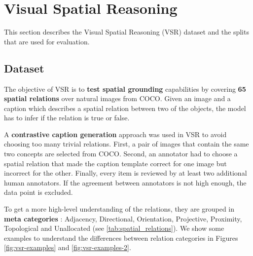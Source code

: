 \section{Visual Spatial Reasoning} \label{sec:vsr}

This section describes the Visual Spatial Reasoning (VSR) \cite{liu2022visual} dataset and the splits that are used for evaluation.

\subsection{Dataset}

The objective of VSR is to \textbf{test spatial grounding} capabilities by covering \textbf{65 spatial relations} over natural images from COCO. Given an image and a caption which describes a spatial relation between two of the objects, the model has to infer if the relation is true or false.

A \textbf{contrastive caption generation} approach was used in VSR to avoid choosing too many trivial relations. First, a pair of images that contain the same two concepts are selected from COCO. Second, an annotator had to choose a spatial relation that made the caption template correct for one image but incorrect for the other. Finally, every item is reviewed by at least two additional human annotators. If the agreement between annotators is not high enough, the data point is excluded.

To get a more high-level understanding of the relations, they are grouped in \textbf{meta categories} \cite{marchi2021cross}: Adjacency, Directional, Orientation, Projective, Proximity, Topological and Unallocated (see \cref{tab:spatial_relations}). We show some examples to understand the differences between relation categories in Figures \ref{fig:vsr-examples} and \ref{fig:vsr-examples-2}.

